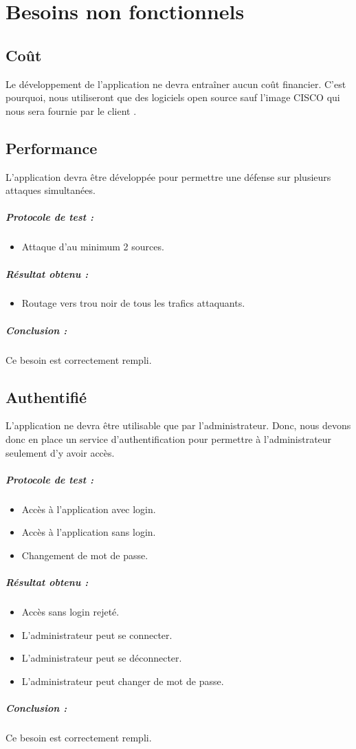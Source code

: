 \newpage

\section{Besoins non fonctionnels}

\subsection{Coût}
Le développement de l'application ne devra entraîner aucun coût financier. C'est pourquoi, nous utiliseront que des logiciels open source sauf l'image CISCO qui nous sera fournie par le client .

\subsection{Performance}
L'application devra être développée pour permettre une défense sur plusieurs attaques simultanées. %

\subparagraph{Protocole de test :}
\begin{itemize}
    \item Attaque d'au minimum 2 sources.
\end{itemize}
\subparagraph{Résultat obtenu :}
    \begin{itemize}
    \item Routage vers trou noir de tous les trafics attaquants.
\end{itemize}
\subparagraph{Conclusion :}Ce besoin est correctement rempli.

\subsection{Authentifié}
L’application ne devra être utilisable que par l'administrateur. Donc, nous devons donc en place un service d'authentification pour permettre à l'administrateur seulement d'y avoir accès.

\subparagraph{Protocole de test :}
\begin{itemize}
    \item Accès à l'application avec login.
    \item Accès à l'application sans login.
    \item Changement de mot de passe.
\end{itemize}
\subparagraph{Résultat obtenu :}
    \begin{itemize}
    \item Accès sans login rejeté.
    \item L'administrateur peut se connecter.
    \item L'administrateur peut se déconnecter.
    \item L'administrateur peut changer de mot de passe.
\end{itemize}
\subparagraph{Conclusion :}Ce besoin est correctement rempli.

